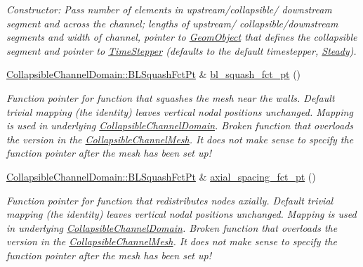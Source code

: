 \begin{DoxyCompactItemize}
\begin{DoxyCompactList}\small\item\em Constructor\+: Pass number of elements in upstream/collapsible/ downstream segment and across the channel; lengths of upstream/ collapsible/downstream segments and width of channel, pointer to \hyperlink{classoomph_1_1GeomObject}{Geom\+Object} that defines the collapsible segment and pointer to \hyperlink{classoomph_1_1TimeStepper}{Time\+Stepper} (defaults to the default timestepper, \hyperlink{classoomph_1_1Steady}{Steady}). \end{DoxyCompactList}\item 
\hyperlink{classoomph_1_1CollapsibleChannelDomain_a2bf1d7943bfac134a5c27a54c7e1faed}{Collapsible\+Channel\+Domain\+::\+B\+L\+Squash\+Fct\+Pt} \& \hyperlink{classoomph_1_1AlgebraicCollapsibleChannelMesh_abf1848b49f57419af4379a637464587d}{bl\+\_\+squash\+\_\+fct\+\_\+pt} ()
\begin{DoxyCompactList}\small\item\em Function pointer for function that squashes the mesh near the walls. Default trivial mapping (the identity) leaves vertical nodal positions unchanged. Mapping is used in underlying \hyperlink{classoomph_1_1CollapsibleChannelDomain}{Collapsible\+Channel\+Domain}. Broken function that overloads the version in the \hyperlink{classoomph_1_1CollapsibleChannelMesh}{Collapsible\+Channel\+Mesh}. It does not make sense to specify the function pointer after the mesh has been set up! \end{DoxyCompactList}\item 
\hyperlink{classoomph_1_1CollapsibleChannelDomain_a2bf1d7943bfac134a5c27a54c7e1faed}{Collapsible\+Channel\+Domain\+::\+B\+L\+Squash\+Fct\+Pt} \& \hyperlink{classoomph_1_1AlgebraicCollapsibleChannelMesh_afa53bd526ff0903526afbdf5e6f4f532}{axial\+\_\+spacing\+\_\+fct\+\_\+pt} ()
\begin{DoxyCompactList}\small\item\em Function pointer for function that redistributes nodes axially. Default trivial mapping (the identity) leaves vertical nodal positions unchanged. Mapping is used in underlying \hyperlink{classoomph_1_1CollapsibleChannelDomain}{Collapsible\+Channel\+Domain}. Broken function that overloads the version in the \hyperlink{classoomph_1_1CollapsibleChannelMesh}{Collapsible\+Channel\+Mesh}. It does not make sense to specify the function pointer after the mesh has been set up! \end{DoxyCompactList}\item 

\end{DoxyCompactItemize}

